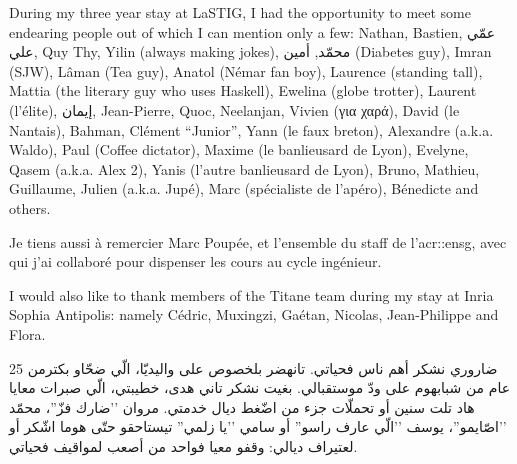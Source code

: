 During my three year stay at LaSTIG, I had the opportunity to meet some endearing people out of which I can mention only a few: Nathan, Bastien, \foreignlanguage{arabic}{عمّي علي}, Quy Thy, Yilin (always making jokes), \foreignlanguage{arabic}{محمّد}, \foreignlanguage{arabic}{أمين} (Diabetes guy), Imran (SJW), Lâman (Tea guy), Anatol (Némar fan boy), Laurence (standing tall), Mattia (the literary guy who uses Haskell), Ewelina (globe trotter), Laurent (l'élite), \foreignlanguage{arabic}{إيمان}, Jean-Pierre, Quoc, Neelanjan, Vivien (\foreignlanguage{greek}{για χαρά}), David (le Nantais), Bahman, Clément ``Junior'', Yann (le faux breton), Alexandre (a.k.a. Waldo), Paul (Coffee dictator), Maxime (le banlieusard de Lyon), Evelyne, Qasem (a.k.a. Alex 2), Yanis (l'autre banlieusard de Lyon), Bruno, Mathieu, Guillaume, Julien (a.k.a. Jupé), Marc (spécialiste de l'apéro), Bénedicte and others.

Je tiens aussi à remercier Marc Poupée, et l'ensemble du staff de l'\acrshort*{acr::ensg}, avec qui j'ai collaboré pour dispenser les cours au cycle ingénieur.

I would also like to thank members of the Titane team during my stay at Inria Sophia Antipolis: namely Cédric, Muxingzi, Gaétan, Nicolas, Jean-Philippe and Flora.

ضاروري نشكر أهم ناس فحياتي.
تانهضر بلخصوص على واليديّا، الّي ضحّاو بكترمن 25 عام من شبابهوم على ودّ موستقبالي.
بغيت نشكر تاني هدى، خطيبتي، الّي صبرات معايا هاد تلت سنين أو تحملّات جزء من اضّغط ديال خدمتي.
مروان ’’ضارك فزّ''، محمّد ’’اصّايمو''، يوسف ’’الّي عارف راسو'' أو سامي ’’يا زلمي'' تيستاحقو حتّى هوما اشّكر أو لعتيراف ديالي: وقفو معيا فواحد من أصعب لمواقيف فحياتي.
